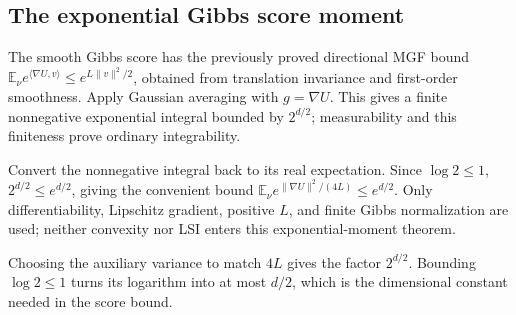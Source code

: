 \documentclass[11pt,a4paper]{report}
\begin{document}
\subsection{\texorpdfstring{The exponential Gibbs score moment}{The exponential Gibbs score moment}}
\label{report-step-UnadjustedLangevin-LSI-EntropyMoment-lean-8}


The smooth Gibbs score has the previously proved directional MGF bound \(\mathbb E_\nu e^{\langle\nabla U,v\rangle}\le e^{L\|v\|^2/2}\), obtained from translation invariance and first-order smoothness. Apply Gaussian averaging with \(g=\nabla U\). This gives a finite nonnegative exponential integral bounded by \(2^{d/2}\); measurability and this finiteness prove ordinary integrability.



Convert the nonnegative integral back to its real expectation. Since \(\log2\le1\), \(2^{d/2}\le e^{d/2}\), giving the convenient bound \(\mathbb E_\nu e^{\|\nabla U\|^2/(4L)}\le e^{d/2}\). Only differentiability, Lipschitz gradient, positive \(L\), and finite Gibbs normalization are used; neither convexity nor LSI enters this exponential-moment theorem.



Choosing the auxiliary variance to match \(4L\) gives the factor \(2^{d/2}\). Bounding \(\log2\le1\) turns its logarithm into at most \(d/2\), which is the dimensional constant needed in the score bound.
\end{document}
